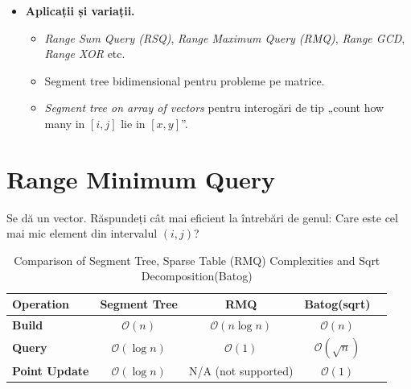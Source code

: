 \documentclass[11pt,a4paper]{article}
\theoremstyle{definition}
\theoremstyle{plain}
\theoremstyle{remark}
\begin{document}
\begin{itemize}
  \item \textbf{Aplicații și variații.}
    \begin{itemize}
      \item \emph{Range Sum Query (RSQ)}, \emph{Range Maximum Query (RMQ)}, \emph{Range GCD}, \emph{Range XOR} etc.
      \item Segment tree bidimensional pentru probleme pe matrice.
      \item \emph{Segment tree on array of vectors} pentru interogări de tip „count how many in \([i,j]\) lie in \([x,y]\)”.
    \end{itemize}
\end{itemize}

\begin{center}
\end{center}




\section{Range Minimum Query}
Se dă un vector. Răspundeți cât mai eficient la întrebări de genul: Care este cel mai mic element din intervalul $(i, j)$?

\begin{table}[h!]
\centering
\label{tab:ds_comparison}
\begin{tabular}{lcccc}
    \toprule
    \textbf{Operation} & \textbf{Segment Tree} & \textbf{RMQ} & \textbf{Batog(sqrt)} \\
    \midrule
    \textbf{Build} & $\mathcal{O}(n)$ & $\mathcal{O}(n \log n)$ & $\mathcal{O}(n)$ \\
    \textbf{Query} & $\mathcal{O}(\log n)$ & $\mathcal{O}(1)$ & $\mathcal{O}(\sqrt{n})$  \\
    \textbf{Point Update} & $\mathcal{O}(\log n)$ & N/A (not supported) & $\mathcal{O}(1)$ \\
    \bottomrule
\end{tabular}
\caption{Comparison of Segment Tree, Sparse Table (RMQ) Complexities and Sqrt Decomposition(Batog)}
\end{table}
\end{document}
